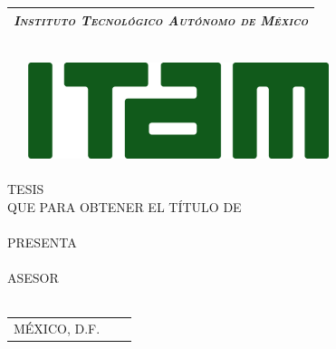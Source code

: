 \begin{titlepage}

	\begin{center}
	\vspace{70pt}
		\begin{tabular}{c}
			\Large \emph{\textsc{Instituto Tecnológico Autónomo de México}}\\
			\hline
		\end{tabular}\\
		\vspace{25pt}
		\includegraphics[width=10cm,height=2.8cm]{LOGO_ITAM.jpg}\\
		\vspace{25pt}
		{\huge \thetitle}\\
		\vspace{5pt}
		\vspace{20 pt}
		TESIS \\
		\vspace{5pt}
		QUE PARA OBTENER EL TÍTULO DE \\
		\vspace{5pt}
		{\Large \thedegree} \\
		\vspace{5pt}
		PRESENTA \\
		\vspace{5pt}
		{\Large \theauthor} \\
		\vfill
		ASESOR \\
		{\Large \theadvisor} \\
		\vspace{5pt}
		\begin{tabular}{lcr}
			MÉXICO, D.F. & \hspace{60pt} & \theyear
		\end{tabular}
	\end{center}
\end{titlepage}
